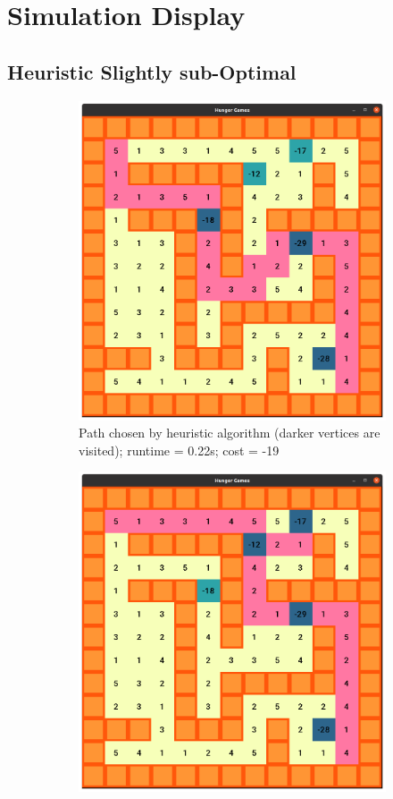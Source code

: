 \documentclass[12pt]{report}
\begin{document}
\chapter{Simulation Display}
\section{Heuristic Slightly sub-Optimal}
\begin{figure}[h]
    \begin{subfigure}{0.5\textwidth}
    \centering
    \includegraphics[width=0.9\linewidth]{assets/latex/differentPath/hpath.png}
    \caption{Path chosen by heuristic algorithm (darker vertices are visited); runtime = 0.22s; cost = -19}
    \end{subfigure}
    \begin{subfigure}{0.5\textwidth}
    \centering
    \includegraphics[width=0.9\linewidth]{assets/latex/differentPath/bpath.png}

\end{subfigure}
\end{figure}
\end{document}
